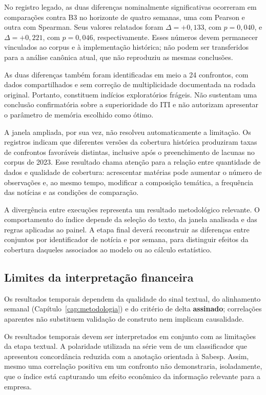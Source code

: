 No registro legado, as duas diferenças nominalmente significativas ocorreram em comparações contra B3 no horizonte de quatro semanas, uma com Pearson e outra com Spearman. Seus valores relatados foram $\Delta=+0{,}133$, com $p=0{,}040$, e $\Delta=+0{,}221$, com $p=0{,}046$, respectivamente. Esses números devem permanecer vinculados ao corpus e à implementação histórica; não podem ser transferidos para a análise canônica atual, que não reproduziu as mesmas conclusões.

As duas diferenças também foram identificadas em meio a 24 confrontos, com dados compartilhados e sem correção de multiplicidade documentada na rodada original. Portanto, constituem indícios exploratórios frágeis. Não sustentam uma conclusão confirmatória sobre a superioridade do ITI e não autorizam apresentar o parâmetro de memória escolhido como ótimo.

A janela ampliada, por sua vez, não resolveu automaticamente a limitação. Os registros indicam que diferentes versões da cobertura histórica produziram taxas de confrontos favoráveis distintas, inclusive após o preenchimento de lacunas no corpus de 2023. Esse resultado chama atenção para a relação entre quantidade de dados e qualidade de cobertura: acrescentar matérias pode aumentar o número de observações e, ao mesmo tempo, modificar a composição temática, a frequência das notícias e as condições de comparação.

A divergência entre execuções representa um resultado metodológico relevante. O comportamento do índice depende da seleção do texto, da janela analisada e das regras aplicadas ao painel. A etapa final deverá reconstruir as diferenças entre conjuntos por identificador de notícia e por semana, para distinguir efeitos da cobertura daqueles associados ao modelo ou ao cálculo estatístico.

\subsection{Limites da interpretação financeira}

Os resultados temporais dependem da qualidade do sinal textual, do alinhamento semanal (Capítulo~\ref{cap:metodologia}) e do critério de delta \textbf{assinado}; correlações aparentes não substituem validação de construto nem implicam causalidade.

\iffalse
Os resultados temporais devem ser interpretados em conjunto com as limitações da etapa textual. A polaridade utilizada na série vem de um classificador que apresentou concordância reduzida com a anotação orientada à Sabesp. Assim, mesmo uma correlação positiva em um confronto não demonstraria, isoladamente, que o índice está capturando um efeito econômico da informação relevante para a empresa.

